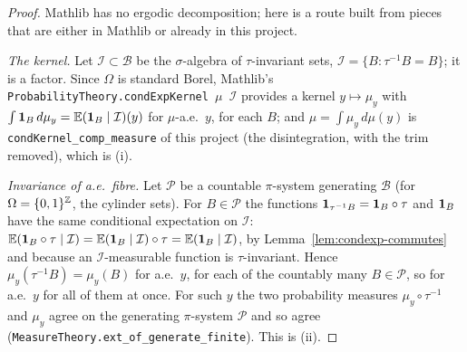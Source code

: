 \begin{proof}
  Mathlib has no ergodic decomposition; here is a route built from pieces that are either in
  Mathlib or already in this project.

  \emph{The kernel.}  Let $\mathcal I \subset \mathcal B$ be the $\sigma$-algebra of
  $\tau$-invariant sets, $\mathcal I = \{B : \tau^{-1}B = B\}$; it is a factor.  Since
  $\Omega$ is standard Borel, Mathlib's \texttt{ProbabilityTheory.condExpKernel \ensuremath{\mu} \ensuremath{\mathcal I}}
  provides a kernel $y \mapsto \mu_y$ with $\int \mathbf{1}_B\,d\mu_y = \mathbb{E}(\mathbf{1}_B\mid\mathcal I)(y)$
  for $\mu$-a.e.\ $y$, for each $B$; and $\mu = \int \mu_y\,d\mu(y)$ is
  \texttt{condKernel\_comp\_measure} of this project (the disintegration, with the trim
  removed), which is (i).

  \emph{Invariance of a.e.\ fibre.}  Let $\mathcal P$ be a countable $\pi$-system generating
  $\mathcal B$ (for $\Omega = \{0,1\}^{\mathbb{Z}}$, the cylinder sets).  For $B \in \mathcal P$ the
  functions $\mathbf{1}_{\tau^{-1}B} = \mathbf{1}_B \circ \tau$ and $\mathbf{1}_B$ have the same conditional
  expectation on $\mathcal I$: $\mathbb{E}(\mathbf{1}_B\circ\tau\mid\mathcal I) = \mathbb{E}(\mathbf{1}_B\mid\mathcal I)\circ\tau
   = \mathbb{E}(\mathbf{1}_B\mid\mathcal I)$, by Lemma~\ref{lem:condexp-commutes} and because an
  $\mathcal I$-measurable function is $\tau$-invariant.  Hence $\mu_y(\tau^{-1}B) = \mu_y(B)$
  for a.e.\ $y$, for each of the countably many $B \in \mathcal P$, so for a.e.\ $y$ for all of
  them at once.  For such $y$ the two probability measures $\mu_y \circ \tau^{-1}$ and $\mu_y$
  agree on the generating $\pi$-system $\mathcal P$ and so agree
  (\texttt{MeasureTheory.ext\_of\_generate\_finite}).  This is (ii).


\end{proof}
